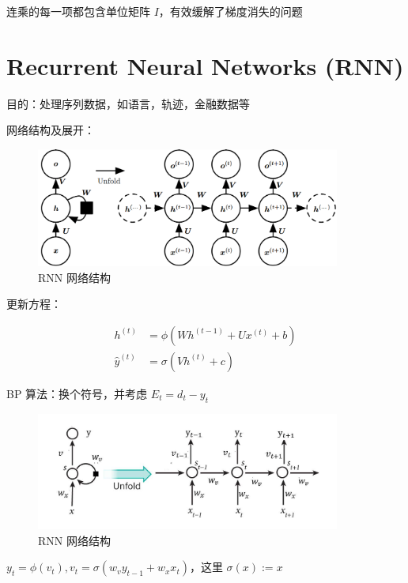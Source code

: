 \documentclass[openany,a4paper,12pt]{ctexbook}
\theoremstyle{kaiti}
\theoremstyle{normal}
\begin{document}
连乘的每一项都包含单位矩阵 $I$，有效缓解了梯度消失的问题

\section{Recurrent Neural Networks (RNN)}

目的：处理序列数据，如语言，轨迹，金融数据等

网络结构及展开：

\begin{figure}
  \centering
  \includegraphics[width=10cm]{1627808597430-8.3.png}
  \caption{RNN 网络结构}
\end{figure}

更新方程：

\begin{equation}
\begin{aligned}
  h^{\left(t \right)}&=\phi \left(Wh^{\left(t-1 \right)}+Ux^{\left(t \right)}+b \right)\\ 
  \hat{y}^{\left(t \right)}&=\sigma \left(Vh^{\left(t \right)}+c \right)
\end{aligned}
\end{equation}

BP 算法：换个符号，并考虑 $E_t=d_t-y_t$

\begin{figure}
  \centering
  \includegraphics[width=10cm]{1627808617206-8.3-2.png}
  \caption{RNN 网络结构}
\end{figure}

$y_t=\phi \left(v_t \right), v_t=\sigma \left(w_vy_{t-1}+w_xx_t \right)$，这里 $\sigma (x):=x$
\end{document}
